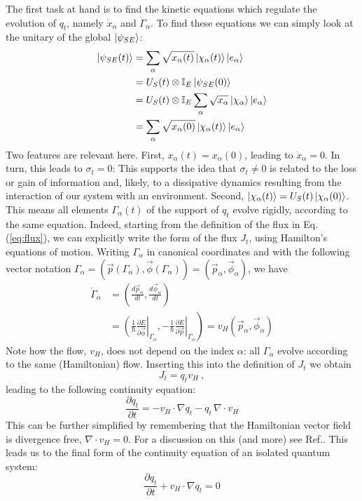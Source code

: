 \documentclass[draft,nofootinbib,pre,twocolumn,showpacs,showkeys,preprintnumbers,floatfix]{revtex4-1}
\newcommand{\1}{\mathbbm{1}}
\begin{document}
The first task at hand is to find the kinetic equations which regulate the evolution of $q_t$, namely $\dot{x}_\alpha$ and $\dot{\Gamma}_\alpha$.
To find these equations we can simply look at the unitary of the global $\ket{\psi_{SE}}$: 
\begin{align}
\ket{\psi_{SE}(t)} &= \sum_\alpha \sqrt{x_\alpha(t)}\ket{\chi_\alpha(t)}\ket{e_\alpha} \nonumber \\
&= U_S(t) \otimes \mathbb{I}_E  \ket{\psi_{SE}(0)} \nonumber \\
&= U_S(t) \otimes \mathbb{I}_E  \sum_\alpha \sqrt{x_\alpha} \ket{\chi_\alpha}\ket{e_\alpha} \nonumber \\
& = \sum_\alpha \sqrt{x_\alpha(0)} \ket{\chi_\alpha(t)}\ket{e_\alpha}
\end{align}
Two features are relevant here. First, $x_\alpha(t)=x_\alpha(0)$, leading to $\dot{x}_\alpha=0$. In turn, this leads to $\sigma_t=0$:
This supports the idea that $\sigma_t \neq 0$ is related to the loss or gain of information and, likely, to a dissipative dynamics
resulting from the interaction of our system with an environment. Second, $\ket{\chi_\alpha(t)}=U_S(t)\ket{\chi_\alpha(0)}$. This
means all elements $\Gamma_\alpha(t)$ of the support of $q_t$ evolve rigidly, according to the same equation. Indeed, starting from the 
definition of the flux in Eq.(\ref{eq:flux}), we can explicitly write the form of the flux $J_t$, 
using Hamilton's equations of motion. Writing $\Gamma_\alpha$ in canonical coordinates and with the following vector notation $\Gamma_\alpha = (\vec{p}(\Gamma_\alpha),\vec{\phi}(\Gamma_\alpha)) = (\vec{p}_\alpha,\vec{\phi}_\alpha)$, 
we have 
\begin{align}
\dot{\Gamma}_\alpha & = \left( \frac{d\vec{p}_\alpha}{dt}, \frac{d\vec{\phi}_\alpha}{dt}\right) \nonumber \\
& = \left.\left( \frac{1}{\hbar}\frac{\partial E}{\partial \vec{\phi}}\right\vert_{\Gamma_\alpha}, \left.-\frac{1}{\hbar}\frac{\partial E}{\partial \vec{p}}\right\vert_{\Gamma_\alpha}  \right) = v_H(\vec{p}_\alpha,\vec{\phi}_\alpha)
\end{align}
Note how the flow, $v_H$, does not depend on the index $\alpha$: all 
$\Gamma_\alpha$ evolve according to the same (Hamiltonian) flow. Inserting this into the definition of $J_t$ 
we obtain
\begin{equation}
J_t = q_t v_H~,
\end{equation}
leading to the following continuity equation:
\begin{equation}
\frac{\partial q_t}{\partial t} = - v_H \cdot \nabla q_t - q_t \, \nabla \cdot v_H
\end{equation}
This can be further simplified by remembering that the Hamiltonian vector field is divergence free, $\nabla \cdot v_H = 0$.
For a discussion on this (and more) see Ref.\cite{Marsd13}. This leads us to the final form of the continuity equation of an isolated 
quantum system:
\begin{equation}
\frac{\partial q_t}{\partial t} + v_H \cdot \nabla q_t =0
\end{equation}
\end{document}
